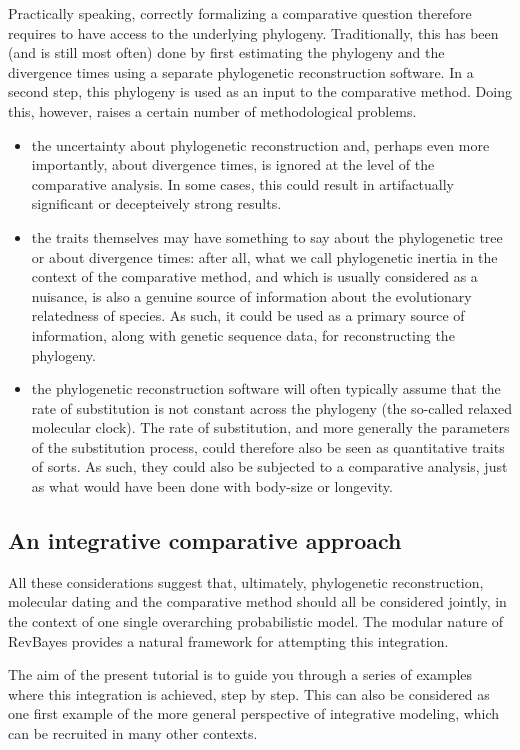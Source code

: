 \documentclass[11pt, oneside]{article}   	%
\begin{document}
Practically speaking, correctly formalizing a comparative question therefore requires to have access to the underlying phylogeny.
Traditionally, this has been (and is still most often) done by first estimating the phylogeny and the divergence times using a separate phylogenetic reconstruction software. In a second step, this phylogeny is used as an input to the comparative method.
Doing this, however, raises a certain number of methodological problems.
\begin{itemize}
\item
the uncertainty about phylogenetic reconstruction and, perhaps even more importantly, about divergence times, is ignored at the level of the comparative analysis. In some cases, this could result in artifactually significant or decepteively strong results.
\item
the traits themselves may have something to say about the phylogenetic tree or about divergence times: after all, what we call phylogenetic inertia in the context of the comparative method, and which is usually considered as a nuisance, is also a genuine source of information about the evolutionary relatedness of species. As such, it could be used as a primary source of information, along with genetic sequence data, for reconstructing the phylogeny.
\item
the phylogenetic reconstruction software will often typically assume that the rate of substitution is not constant across the phylogeny (the so-called relaxed molecular clock).
The rate of substitution, and more generally the parameters of the substitution process, could therefore also be seen as quantitative traits of sorts. As such, they could also be subjected to a comparative analysis, just as what would have been done with body-size or longevity.
\end{itemize}

\subsection{An integrative comparative approach}

All these considerations suggest that, ultimately, phylogenetic reconstruction, molecular dating and the comparative method should all be considered jointly, in the context of one single overarching probabilistic model.
The modular nature of RevBayes provides a natural framework for attempting this integration.

The aim of the present tutorial is to guide you through a series of examples where this integration is achieved, step by step.
This can also be considered as one first example of the more general perspective of integrative modeling, which can be recruited in many other contexts.
\end{document}
